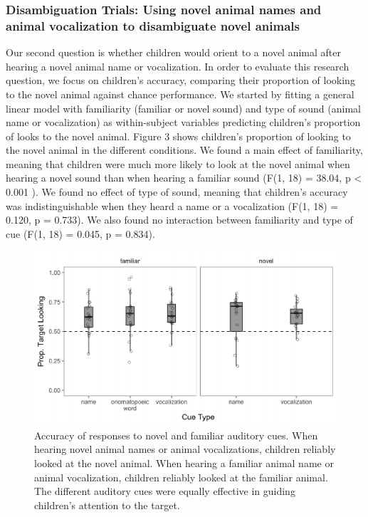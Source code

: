\documentclass[english,floatsintext,man]{apa6}
\theoremstyle{definition}
\theoremstyle{definition}
\theoremstyle{definition}
\theoremstyle{remark}
\begin{document}
\subsubsection{Disambiguation Trials: Using novel animal names and
animal vocalization to disambiguate novel
animals}\label{disambiguation-trials-using-novel-animal-names-and-animal-vocalization-to-disambiguate-novel-animals}

Our second question is whether children would orient to a novel animal
after hearing a novel animal name or vocalization. In order to evaluate
this research question, we focus on children's accuracy, comparing their
proportion of looking to the novel animal against chance performance. We
started by fitting a general linear model with familiarity (familiar or
novel sound) and type of sound (animal name or vocalization) as
within-subject variables predicting children's proportion of looks to
the novel animal. Figure 3 shows children's proportion of looking to the
novel animal in the different conditions. We found a main effect of
familiarity, meaning that children were much more likely to look at the
novel animal when hearing a novel sound than when hearing a familiar
sound (F(1, 18) = 38.04, p \textless{} 0.001 ). We found no effect of
type of sound, meaning that children's accuracy was indistinguishable
when they heard a name or a vocalization (F(1, 18) = 0.120, p = 0.733).
We also found no interaction between familiarity and type of cue (F(1,
18) = 0.045, p = 0.834).

\begin{figure}
\centering
\includegraphics{anime_manuscript_files/figure-latex/unnamed-chunk-3-1.pdf}
\caption{\label{fig:unnamed-chunk-3}Accuracy of responses to novel and
familiar auditory cues. When hearing novel animal names or animal
vocalizations, children reliably looked at the novel animal. When
hearing a familiar animal name or animal vocalization, children reliably
looked at the familiar animal. The different auditory cues were equally
effective in guiding children's attention to the target.}
\end{figure}
\end{document}
